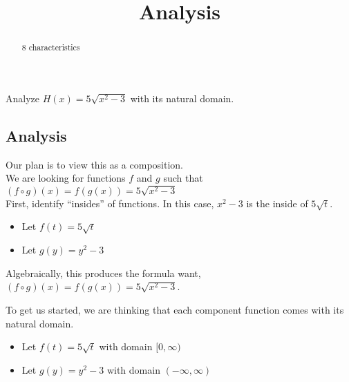 \documentclass{ximera}
\title{Analysis}
\begin{document}
\begin{abstract}
8 characteristics
\end{abstract}
\maketitle












Analyze $H(x) = 5 \sqrt{x^2-3}$ with its natural domain. \\



\subsection*{Analysis}




Our plan is to view this as a composition. \\






We are looking for functions $f$ and $g$ such that $(f \circ g)(x) = f(g(x)) = 5 \sqrt{x^2-3}$ \\


First, identify ``insides'' of functions.  In this case, $x^2 - 3$ is the inside of $5 \sqrt{t}$. \\



\begin{itemize}
\item Let $f(t) = 5 \sqrt{t}$ \\
\item Let $g(y) = y^2 - 3$ \\
\end{itemize}

Algebraically, this produces the formula want, $(f \circ g)(x) = f(g(x)) = 5 \sqrt{x^2-3}$.

To get us started, we are thinking that each component function comes with its natural domain.

\begin{itemize}
\item Let $f(t) = 5 \sqrt{t}$ with domain $[0, \infty)$ \\
\item Let $g(y) = y^2 - 3$ with domain $(-\infty, \infty)$ \\
\end{itemize}
\end{document}
